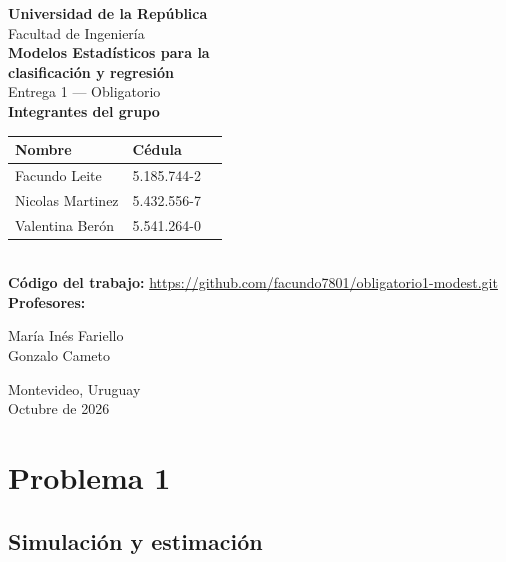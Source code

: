 \documentclass[10pt,a4paper]{article}
\begin{document}
\thispagestyle{empty}
\pagestyle{empty}

\begin{center}
\vspace*{1.5cm}

{\Large\bfseries\color{azul} Universidad de la República}\\[4pt]
{\large Facultad de Ingeniería}\\[2.5cm]


{\Large\bfseries\color{azul} Modelos Estadísticos para la}\\[-1pt]
{\Large\bfseries\color{azul} clasificación y regresión}\\[6pt]
{\large Entrega 1 --- Obligatorio}\\[3cm]

\textbf{Integrantes del grupo}\\[8pt]
\begin{tabular}{@{}lll@{}}
\toprule
\textbf{Nombre} & \textbf{Cédula}\\[1pt]
\midrule
Facundo Leite & 5.185.744-2 & \\
Nicolas Martinez & 5.432.556-7\\
Valentina Berón & 5.541.264-0\\
\bottomrule
\end{tabular}\\[3cm]

\textbf{Código del trabajo:} \url{https://github.com/facundo7801/obligatorio1-modest.git}\\[2.5cm]


\textbf{Profesores:} 
\begin{center}
    María Inés Fariello\\[6pt]
    Gonzalo Cameto\\
\end{center}


\vfill

Montevideo, Uruguay\\[4pt]
Octubre de 2026

\end{center}

\newpage
\section{Problema 1}

\subsection{Simulación y estimación}
\end{document}
